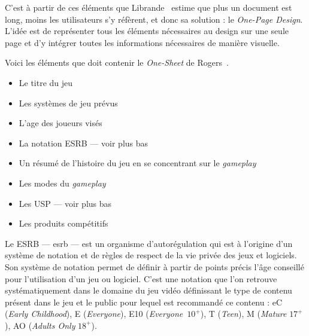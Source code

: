 
C'est à partir de ces éléments que Librande~\cite{onepage_librande} estime que plus un document est long, moins les utilisateurs s'y réfèrent, et donc sa solution : le \emph{One-Page Design}.\\
L'idée est de représenter tous les éléments nécessaires au design sur une seule page et d'y intégrer toutes les informations nécessaires de manière visuelle. 





Voici les éléments que doit contenir le \emph{One-Sheet} de Rogers~\cite{LevelUpRogers2014}.
\begin{itemize}
    \item Le titre du jeu
    \item Les systèmes de jeu prévus
    \item L'age des joueurs visés
    \item La notation ESRB --- voir plus bas
    \item Un résumé de l'histoire du jeu en se concentrant sur le \emph{gameplay}
    \item Les modes du \emph{gameplay}
    \item Les USP --- voir plus bas
    \item Les produits compétitifs
\end{itemize}


Le ESRB --- \gls{esrb} --- est un organisme d'autorégulation qui est à l'origine d'un système de notation et de règles de respect de la vie privée des jeux et logiciels. Son système de notation permet de définir à partir de points précis l'âge conseillé pour l'utilisation d'un jeu ou logiciel. C'est une notation que l'on retrouve systématiquement dans le domaine du jeu vidéo définissant le type de contenu présent dans le jeu et le public pour lequel est recommandé ce contenu : eC (\emph{Early Childhood}), E (\emph{Everyone}), E10 (\emph{Everyone~$10^+$}), T (\emph{Teen}), M (\emph{Mature} $17^+$), AO (\emph{Adults Only} $18^+$).



